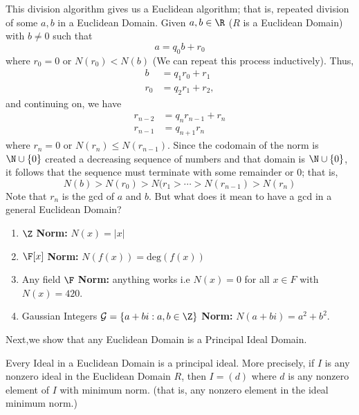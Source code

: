 This division algorithm gives us a Euclidean algorithm; that is, repeated division of some \( a,b  \) in a Euclidean Domain.
Given \( a,b \in \R  \) (\( R  \) is a Euclidean Domain) with \( b \neq 0  \) such that 
\[  a = {q}_{0}b + {r}_{0} \]
where \( {r}_{0} = 0  \) or \( N({r}_{0}) < N(b) \) (We can repeat this process inductively). Thus,   
\begin{align*}
     b  &= {q}_{1} {r}_{0} + {r}_{1} \\
     {r}_{0} &= {q}_{2} {r}_{1} + {r}_{2},
\end{align*}
and continuing on, we have
\begin{align*}
    {r}_{n-2} &= {q}_{n} {r}_{n-1} + {r}_{n}  \\
    {r}_{n-1} &= {q}_{n+1} {r}_{n}
\end{align*}
where \( {r}_{n} = 0  \) or \( N({r}_{n}) \leq N({r}_{n-1}) \). Since the codomain of the norm is \( \N \cup \{ 0  \}  \) created a decreasing sequence of numbers and that domain is \( \N \cup \{ 0  \}  \), it follows that the sequence must terminate with some remainder or \( 0  \); that is,
\[  N(b) > N({r}_{0}) > N({r}_{1} > \cdots > N({r}_{n-1}) > N({r}_{n})  \]
Note that \( {r}_{n} \) is the gcd of \( a \) and \( b  \). But what does it mean to have a gcd in a general Euclidean Domain?

\begin{eg}
    \begin{enumerate}
        \item[(i)] \( \Z  \) \textbf{Norm:} \( N(x) = | x  |  \) 
        \item[(ii)] \( \F[x]  \)  \textbf{Norm:} \( N(f(x)) = \text{deg}(f(x))    \)
        \item[(iii)] Any field \( \F  \) \textbf{Norm:} anything works i.e \( N(x) = 0  \) for all \( x \in F  \) with \( N(x) = 420 \).  
        \item[(iv)] Gaussian Integers \( \mathcal{G}  = \{ a + bi : a,b \in \Z  \}  \) \textbf{Norm:} \( N(a + bi) = a^{2}+ b^{2} \). 
    \end{enumerate}
\end{eg}

Next,we show that any Euclidean Domain is a Principal Ideal Domain.

\begin{prop}
    Every Ideal in a Euclidean Domain is a principal ideal. More precisely, if \( I \) is any nonzero ideal in the Euclidean Domain \( R  \), then \( I = (d)  \) where \( d \) is any nonzero element of \( I \) with minimum norm. (that is, any nonzero element in the ideal minimum norm.)    
\end{prop}

